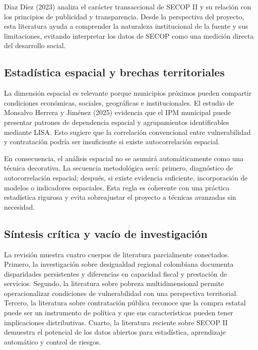 \documentclass[11pt,letterpaper]{article}
\begin{document}
Díaz Díez (2023) analiza el carácter transaccional de SECOP II y su relación
con los principios de publicidad y transparencia. Desde la perspectiva del
proyecto, esta literatura ayuda a comprender la naturaleza institucional de la
fuente y sus limitaciones, evitando interpretar los datos de SECOP como una
medición directa del desarrollo social.

\subsection{Estadística espacial y brechas territoriales}

La dimensión espacial es relevante porque municipios próximos pueden compartir
condiciones económicas, sociales, geográficas e institucionales. El estudio de
Monsalvo Herrera y Jiménez (2025) evidencia que el IPM municipal puede
presentar patrones de dependencia espacial y agrupamientos identificables
mediante LISA. Esto sugiere que la correlación convencional entre
vulnerabilidad y contratación podría ser insuficiente si existe
autocorrelación espacial.

En consecuencia, el análisis espacial no se asumirá automáticamente como una
técnica decorativa. La secuencia metodológica será: primero, diagnóstico de
autocorrelación espacial; después, si existe evidencia suficiente,
incorporación de modelos o indicadores espaciales. Esta regla es coherente con
una práctica estadística rigurosa y evita sobreajustar el proyecto a técnicas
avanzadas sin necesidad.

\subsection{Síntesis crítica y vacío de investigación}

La revisión muestra cuatro cuerpos de literatura parcialmente conectados.
Primero, la investigación sobre desigualdad regional colombiana documenta
disparidades persistentes y diferencias en capacidad fiscal y prestación de
servicios. Segundo, la literatura sobre pobreza multidimensional permite
operacionalizar condiciones de vulnerabilidad con una perspectiva territorial.
Tercero, la literatura sobre contratación pública reconoce que la compra
estatal puede ser un instrumento de política y que sus características pueden
tener implicaciones distributivas. Cuarto, la literatura reciente sobre SECOP
II demuestra el potencial de los datos abiertos para estadística, aprendizaje
automático y control de riesgos.
\end{document}
